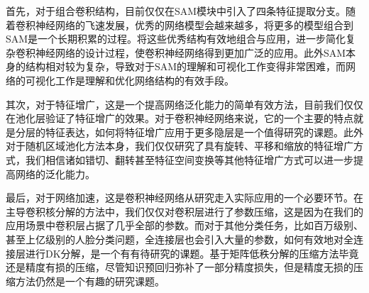 首先，对于组合卷积结构，目前仅仅在SAM模块中引入了四条特征提取分支。随着卷积神经网络的飞速发展，优秀的网络模型会越来越多，将更多的模型组合到SAM是一个长期积累的过程。将这些优秀结构有效地组合与应用，进一步简化复杂卷积神经网络的设计过程，使卷积神经网络得到更加广泛的应用。此外SAM本身的结构相对较为复杂，导致对于SAM的理解和可视化工作变得非常困难，而网络的可视化工作是理解和优化网络结构的有效手段。

其次，对于特征增广，这是一个提高网络泛化能力的简单有效方法，目前我们仅仅在池化层验证了特征增广的效果。对于卷积神经网络来说，它的一个主要的特点就是分层的特征表达，如何将特征增广应用于更多隐层是一个值得研究的课题。此外对于随机区域池化方法本身，我们仅仅研究了具有旋转、平移和缩放的特征增广方式，我们相信诸如错切、翻转甚至特征空间变换等其他特征增广方式可以进一步提高网络的泛化能力。

最后，对于网络加速，这是卷积神经网络从研究走入实际应用的一个必要环节。在主导卷积核分解的方法中，我们仅仅对卷积层进行了参数压缩，这是因为在我们的应用场景中卷积层占据了几乎全部的参数。而对于其他分类任务，比如百万级别、甚至上亿级别的人脸分类问题，全连接层也会引入大量的参数，如何有效地对全连接层进行DK分解，是一个有有待研究的课题。基于矩阵低秩分解的压缩方法毕竟还是精度有损的压缩，尽管知识预回归弥补了一部分精度损失，但是精度无损的压缩方法仍然是一个有趣的研究课题。


